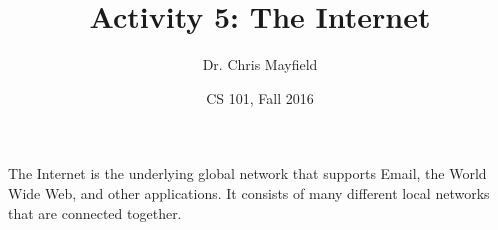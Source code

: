 \documentclass[12pt]{article}
\title{Activity 5: The Internet}
\author{Dr. Chris Mayfield}
\date{CS 101, Fall 2016}
\begin{document}
\maketitle

The Internet is the underlying global network that supports Email, the World Wide Web, and other applications. It consists of many different local networks that are connected together. 


\newpage

\end{document}
